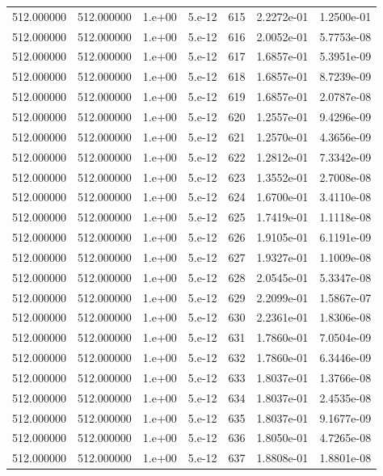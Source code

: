\begin{table}[htbp]
\begin{tabular}{rrrrrrr}
512.000000 & 512.000000 & 1.e+00 & 5.e-12 & 615 & 2.2272e-01 & 1.2500e-01 \\
512.000000 & 512.000000 & 1.e+00 & 5.e-12 & 616 & 2.0052e-01 & 5.7753e-08 \\
512.000000 & 512.000000 & 1.e+00 & 5.e-12 & 617 & 1.6857e-01 & 5.3951e-09 \\
512.000000 & 512.000000 & 1.e+00 & 5.e-12 & 618 & 1.6857e-01 & 8.7239e-09 \\
512.000000 & 512.000000 & 1.e+00 & 5.e-12 & 619 & 1.6857e-01 & 2.0787e-08 \\
512.000000 & 512.000000 & 1.e+00 & 5.e-12 & 620 & 1.2557e-01 & 9.4296e-09 \\
512.000000 & 512.000000 & 1.e+00 & 5.e-12 & 621 & 1.2570e-01 & 4.3656e-09 \\
512.000000 & 512.000000 & 1.e+00 & 5.e-12 & 622 & 1.2812e-01 & 7.3342e-09 \\
512.000000 & 512.000000 & 1.e+00 & 5.e-12 & 623 & 1.3552e-01 & 2.7008e-08 \\
512.000000 & 512.000000 & 1.e+00 & 5.e-12 & 624 & 1.6700e-01 & 3.4110e-08 \\
512.000000 & 512.000000 & 1.e+00 & 5.e-12 & 625 & 1.7419e-01 & 1.1118e-08 \\
512.000000 & 512.000000 & 1.e+00 & 5.e-12 & 626 & 1.9105e-01 & 6.1191e-09 \\
512.000000 & 512.000000 & 1.e+00 & 5.e-12 & 627 & 1.9327e-01 & 1.1009e-08 \\
512.000000 & 512.000000 & 1.e+00 & 5.e-12 & 628 & 2.0545e-01 & 5.3347e-08 \\
512.000000 & 512.000000 & 1.e+00 & 5.e-12 & 629 & 2.2099e-01 & 1.5867e-07 \\
512.000000 & 512.000000 & 1.e+00 & 5.e-12 & 630 & 2.2361e-01 & 1.8306e-08 \\
512.000000 & 512.000000 & 1.e+00 & 5.e-12 & 631 & 1.7860e-01 & 7.0504e-09 \\
512.000000 & 512.000000 & 1.e+00 & 5.e-12 & 632 & 1.7860e-01 & 6.3446e-09 \\
512.000000 & 512.000000 & 1.e+00 & 5.e-12 & 633 & 1.8037e-01 & 1.3766e-08 \\
512.000000 & 512.000000 & 1.e+00 & 5.e-12 & 634 & 1.8037e-01 & 2.4535e-08 \\
512.000000 & 512.000000 & 1.e+00 & 5.e-12 & 635 & 1.8037e-01 & 9.1677e-09 \\
512.000000 & 512.000000 & 1.e+00 & 5.e-12 & 636 & 1.8050e-01 & 4.7265e-08 \\
512.000000 & 512.000000 & 1.e+00 & 5.e-12 & 637 & 1.8808e-01 & 1.8801e-08 \\

\end{tabular}
\end{table}
